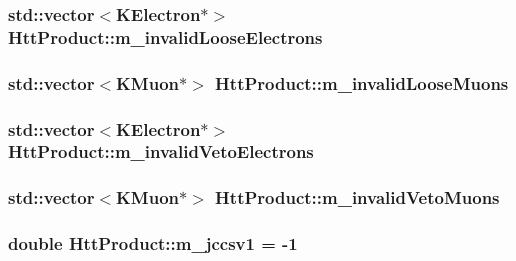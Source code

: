 \label{classHttProduct_ab3c39138bbc65d2e38906de8726f21b4}
\hypertarget{classHttProduct_a82093fe39383edfbc2979d94d7571b9c}{
\subsubsection[{m\_\-invalidLooseElectrons}]{\setlength{\rightskip}{0pt plus 5cm}std::vector$<$KElectron$\ast$$>$ {\bf HttProduct::m\_\-invalidLooseElectrons}}}
\label{classHttProduct_a82093fe39383edfbc2979d94d7571b9c}
\hypertarget{classHttProduct_a66da1a4ef1d2123a91736e848c59eeed}{
\subsubsection[{m\_\-invalidLooseMuons}]{\setlength{\rightskip}{0pt plus 5cm}std::vector$<$KMuon$\ast$$>$ {\bf HttProduct::m\_\-invalidLooseMuons}}}
\label{classHttProduct_a66da1a4ef1d2123a91736e848c59eeed}
\hypertarget{classHttProduct_affc89af16634fbc01c58de3632220b1f}{
\subsubsection[{m\_\-invalidVetoElectrons}]{\setlength{\rightskip}{0pt plus 5cm}std::vector$<$KElectron$\ast$$>$ {\bf HttProduct::m\_\-invalidVetoElectrons}}}
\label{classHttProduct_affc89af16634fbc01c58de3632220b1f}
\hypertarget{classHttProduct_abab9056d187c5418241eac5bd0f096ec}{
\subsubsection[{m\_\-invalidVetoMuons}]{\setlength{\rightskip}{0pt plus 5cm}std::vector$<$KMuon$\ast$$>$ {\bf HttProduct::m\_\-invalidVetoMuons}}}
\label{classHttProduct_abab9056d187c5418241eac5bd0f096ec}
\hypertarget{classHttProduct_ac6955f8cf5af8bed0cbd98dc28a63e82}{
\subsubsection[{m\_\-jccsv1}]{\setlength{\rightskip}{0pt plus 5cm}double {\bf HttProduct::m\_\-jccsv1} = -\/1}}

